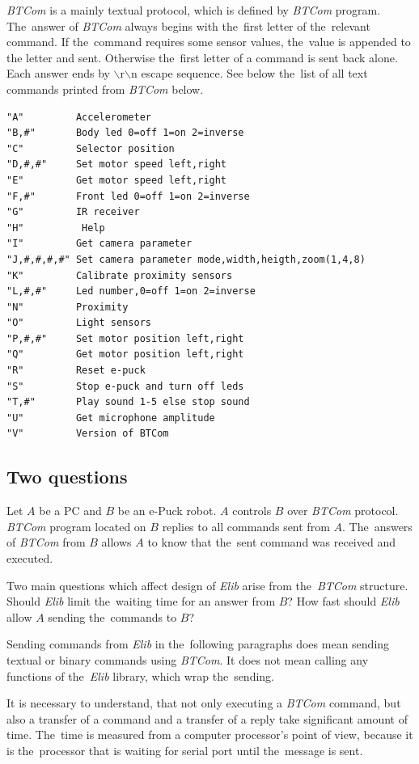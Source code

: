   {\it BTCom} is a mainly textual protocol, which is defined by {\it BTCom} program. The~answer of {\it BTCom} always begins 
  with the~first letter of the~relevant command.
  If the~command requires some sensor values, the~value is appended to the letter and
  sent. Otherwise the~first letter of a command is sent back alone. Each answer ends by 
  $\backslash$r$\backslash$n escape sequence.
  See below the~list of all text commands printed from {\it BTCom} below.
  \lstset{basicstyle=\small}
\begin{lstlisting}
"A"         Accelerometer
"B,#"       Body led 0=off 1=on 2=inverse
"C"         Selector position
"D,#,#"     Set motor speed left,right
"E"         Get motor speed left,right
"F,#"       Front led 0=off 1=on 2=inverse
"G"         IR receiver
"H"          Help
"I"         Get camera parameter
"J,#,#,#,#" Set camera parameter mode,width,heigth,zoom(1,4,8)
"K"         Calibrate proximity sensors
"L,#,#"     Led number,0=off 1=on 2=inverse
"N"         Proximity
"O"         Light sensors
"P,#,#"     Set motor position left,right
"Q"         Get motor position left,right
"R"         Reset e-puck
"S"         Stop e-puck and turn off leds
"T,#"       Play sound 1-5 else stop sound
"U"         Get microphone amplitude
"V"         Version of BTCom
\end{lstlisting}
    
  \subsection*{Two questions} %
  Let $A$ be a PC and $B$ be an e-Puck robot. $A$ controls $B$ over {\it BTCom} protocol. {\it BTCom} program located on $B$ 
  replies to all commands sent from $A$.
  The~answers of {\it BTCom} from $B$ allows $A$ to know that the~sent command was received and
  executed. 
   
  Two main questions which affect design of {\it Elib} arise from the~{\it BTCom} structure.
  Should {\it Elib} limit the~waiting time for an answer from $B$?
  How fast should {\it Elib} allow $A$ sending the~commands to $B$?
  \begin{remark}
  Sending commands from {\it Elib} in the~following paragraphs does mean 
  sending textual or binary commands
  using {\it BTCom}. It does not mean calling any functions of the~{\it Elib} library, which wrap the~sending. 
  \end{remark}
   
  It is necessary to understand, that not only executing a {\it BTCom} command, 
  but also a transfer of a command and a transfer of a reply take significant amount of time. 
  The~time is measured from a computer processor's point of view, because
  it is the~processor that is waiting for serial port until the~message is sent.
   
